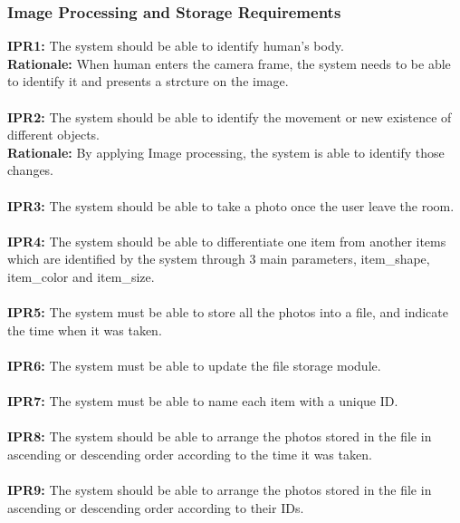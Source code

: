 \documentclass[12pt]{article}
\begin{document}
\subsubsection{Image Processing and Storage Requirements}
\textbf{IPR1:} The system should be able to identify human's body.\\
\textbf{Rationale:} When human enters the camera frame, the system needs to be able to identify it and presents a strcture on the image.\\\\
\textbf{IPR2:} The system should be able to identify the movement or new existence of different objects. \\
\textbf{Rationale:} By applying Image processing, the system is able to identify those changes.\\\\
\textbf{IPR3:} The system should be able to take a photo once the user leave the room.\\\\
\textbf{IPR4:} The system should be able to differentiate one item from another items which are identified by the system through 3 main parameters, item\_shape, item\_color and item\_size.\\\\
\textbf{IPR5:} The system must be able to store all the photos into a file, and indicate the time when it was taken.\\\\
\textbf{IPR6:} The system must be able to update the file storage module.\\\\
\textbf{IPR7:} The system must be able to name each item with a unique ID.\\\\
\textbf{IPR8:} The system should be able to arrange the photos stored in the file in ascending or descending order according to the time it was taken.\\\\
\textbf{IPR9:} The system should be able to arrange the photos stored in the file in ascending or descending order according to their IDs.
\end{document}
